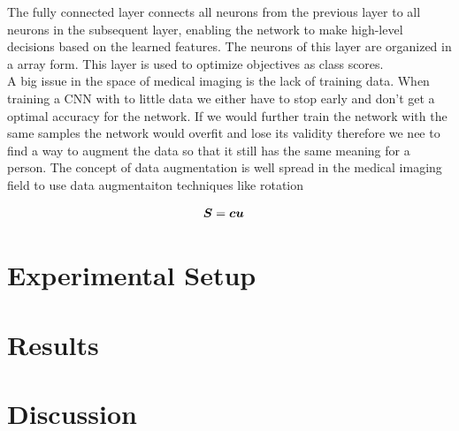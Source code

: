 \documentclass[
a4paper, 
12pt,
grayscalebody, %
abstract=on,
twoside, BCOR10mm, 12pt, DIV13,headinclude, footexclude, final, abstracton, openright
]{ibireprt}
\numberwithin{equation}{chapter}
\numberwithin{table}{chapter}
\numberwithin{figure}{chapter}
\numberwithin{algorithm}{chapter}
\numberwithin{example}{chapter}
\numberwithin{example}{chapter}
\newcommand{\zb}[1]{\mbox{\boldmath{${#1}$}}}
\begin{document}
The fully connected layer connects all neurons from the previous layer to all neurons in the subsequent layer, enabling the network to make high-level decisions based on the learned features. The neurons of this layer are organized in a array form. This layer is used to optimize objectives as class scores.\\
A big issue in the space of medical imaging is the lack of training data. When training a CNN with to little data we either have to stop early and don't get a optimal accuracy for the network. If we would further train the network with the same samples the network would overfit and lose its validity  
therefore we nee to find a way to augment the data so that it still has the same meaning for a person. The concept of data augmentation is well spread in the medical imaging field 
to use data augmentaiton techniques like rotation 

\begin{align}
 \zb S &= \zb c \zb u
\end{align}

\chapter{Experimental Setup}



\chapter{Results}

\chapter{Discussion}


\end{document}
